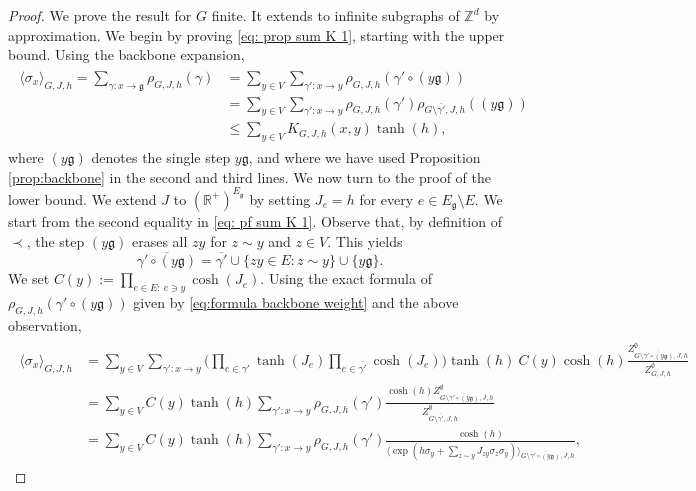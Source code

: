 \documentclass[11pt,a4paper]{article}
\numberwithin{equation}{section}
\theoremstyle{plain}
\theoremstyle{definition}
\newcommand\fg{\mathfrak{g}}
\begin{document}
\begin{proof} We prove the result for $G$ finite. It extends to infinite subgraphs of $\mathbb Z^d$ by approximation. We begin by proving \eqref{eq: prop sum K 1}, starting with the upper bound. Using the backbone expansion,
\begin{align}\label{eq: pf sum K 1}
\begin{aligned}
	\langle \sigma_x\rangle_{G,J,h}=\sum_{\gamma:x\rightarrow \mathfrak g}\rho_{G,J,h}(\gamma)&=\sum_{y\in V}\sum_{\gamma':x\rightarrow y}\rho_{G,J,h}(\gamma'\circ (y\fg))
	\\&=\sum_{y\in V}\sum_{\gamma':x\rightarrow y}\rho_{G,J,h}(\gamma')\rho_{G\setminus{\overline{\gamma'}},J,h}((y\fg))
	\\&\leq \sum_{y\in V}K_{G,J,h}(x,y)\tanh(h),
	\end{aligned}
\end{align}
	where $(y\fg)$ denotes the single step $y\fg$, and where we have used Proposition \ref{prop:backbone} in the second and third lines. We now turn to the proof of the lower bound. We extend $J$ to $(\mathbb R^+)^{E_\fg}$ by setting $J_e=h$ for every $e\in E_\fg\setminus E$. We start from the second equality in \eqref{eq: pf sum K 1}. Observe that, by definition of $\prec$, the step $(y\fg)$ erases all $zy$ for $z\sim y$ and $z\in V$. This yields
	\begin{equation}
		\overline{\gamma'\circ (y\fg)}=\overline{\gamma'}\cup \{zy\in E: z\sim y\} \cup \{y\fg\}.
	\end{equation}
	We set $C(y):=\prod_{e\in E: \:e\ni y} \cosh(J_e)$.
	Using the exact formula of $\rho_{G,J,h}(\gamma'\circ (y\fg))$ given by \eqref{eq:formula backbone weight} and the above observation, 
	\begin{align}\label{eq: pf sum K 2}
		\begin{aligned}
			\langle \sigma_x\rangle_{G,J,h}&=\sum_{y\in V}\sum_{\gamma':x\rightarrow y}\Big(\prod_{e\in \gamma'}\tanh(J_e) \prod_{e\in \overline{\gamma'}}\cosh(J_e)\Big) \tanh(h) \:C(y)\cosh(h) \frac{Z^\emptyset_{G\setminus \overline{\gamma'\circ (y\fg)},J,h}}{Z^\emptyset_{G,J,h}}
			\\&=\sum_{y\in V}C(y)\tanh(h)\sum_{\gamma':x\rightarrow y}\rho_{G,J,h}(\gamma')\frac{\cosh(h)Z^\emptyset_{G\setminus \overline{\gamma'\circ (y\fg)},J,h}}{Z^\emptyset_{G\setminus \overline{\gamma'},J,h}}
			\\&=\sum_{y\in V}C(y)\tanh(h)\sum_{\gamma':x\rightarrow y}\rho_{G,J,h}(\gamma')\frac{\cosh(h)}{\langle \exp(h\sigma_y+\sum_{z\sim y}J_{zy}\sigma_z\sigma_y)\rangle_{G\setminus\overline{\gamma'\circ (y\fg)},J,h}},

\end{aligned}
\end{align}
\end{proof}
\end{document}

